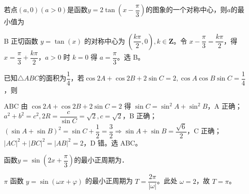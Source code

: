 


\begin{question}
若点$(a,0)(a>0)$是函数$y=2\tan \left( x-\dfrac{\pi}{3} \right)$的图象的一个对称中心，则$a$的最小值为\choiceBox
{}
\end{question}
\begin{answer}{B}
正切函数 $y=\tan(x)$ 的对称中心为 $\left(\dfrac{k\pi}{2},0\right),k\in\mathbf{Z}$。令 $x-\dfrac{\pi}{3}=\dfrac{k\pi}{2}$，得 $x=\dfrac{\pi}{3}+\dfrac{k\pi}{2}$，$a>0$ 时 $k=0$ 得 $a=\dfrac{\pi}{3}$。选 B。
\end{answer}

\begin{question}
已知$\triangle ABC$的面积为$\dfrac{1}{4}$，若$\cos 2A+\cos 2B+2\sin C=2,\cos A\cos B\sin C=\dfrac{1}{4}$，则\choiceBox



\end{question}
\begin{answer}{ABC}
由 $\cos2A+\cos2B+2\sin C=2$ 得 $\sin C=\sin^2A+\sin^2B$，A 正确；$a^2+b^2=c^2,2R=\dfrac c{\sin C}=\sqrt2,c=\sqrt2$，B 正确；$(\sin A+\sin B)^2=\sin C+\dfrac12=\dfrac32\Rightarrow\sin A+\sin B=\dfrac{\sqrt6}{2}$，C 正确；$|AC|^2+|BC|^2=|AB|^2=2$，D 错。选 ABC。
\end{answer}

\begin{question}[GPT生成]
函数$y=\sin(2x+\dfrac{\pi}{3})$的最小正周期为\blank{3cm}．
\end{question}
\begin{answer}{$\pi$}
函数 $y=\sin(\omega x+\varphi)$ 的最小正周期为 $T=\dfrac{2\pi}{|\omega|}$。此处 $\omega=2$，故 $T=\pi$。
\end{answer}




